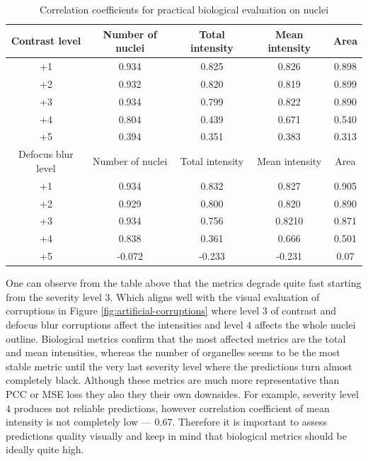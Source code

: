\begin{table}[htb]
    \centering
    \caption{Correlation coefficients for practical biological evaluation on nuclei}
            \begin{tabular}{|c|c|c|c|c|}\hline
                Contrast level&Number of nuclei&Total intensity&Mean intensity&Area\\\hline\hline
                +1&0.934&0.825&0.826&0.898\\\hline
                +2&0.932&0.820&0.819&0.899\\\hline
                +3&0.934&0.799&0.822&0.890\\\hline
                +4&0.804&0.439&0.671&0.540\\\hline
                +5&0.394&0.351&0.383&0.313\\\hline \hline
				Defocus blur level&Number of nuclei&Total intensity&Mean intensity&Area\\\hline\hline
                +1&0.934&0.832&0.827&0.905\\\hline 
                +2&0.929&0.800&0.820&0.890\\\hline
                +3&0.934&0.756&0.8210&0.871\\\hline
                +4&0.838&0.361&0.666&0.501\\\hline
                +5&-0.072&-0.233&-0.231&0.07\\\hline
            \end{tabular}
        \label{table:nuclei-corruptions-downstream-metrics-coefficients}
\end{table} 

One can observe from the table above that the metrics degrade quite fast starting from the severity level $3$. Which aligns well with the visual evaluation of corruptions in Figure \ref{fig:artificial-corruptions} where level $3$ of contrast and defocus blur corruptions affect the intensities and level $4$ affects the whole nuclei outline. Biological metrics confirm that the most affected metrics are the total and mean intensities, whereas the number of organelles seems to be the most stable metric until the very last severity level where the predictions turn almost completely black. Although these metrics are much more representative than PCC or MSE loss they also they their own downsides. For example, severity level $4$ produces not reliable predictions, however correlation coefficient of mean intensity is not completely low --- $0.67$. Therefore it is important to assess predictions quality visually and keep in mind that biological metrics should be ideally quite high.